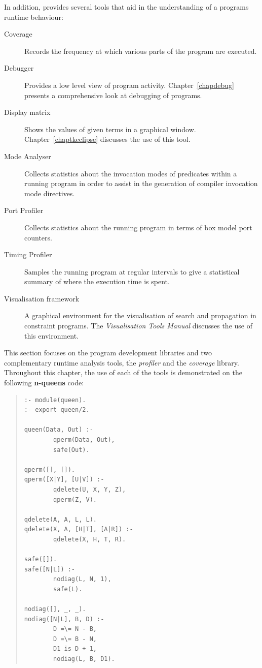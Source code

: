 In addition, \eclipse{} provides several tools that aid in the
understanding of a programs runtime behaviour:

\begin{description}
\item[Coverage] Records the frequency at which various parts of the
program are executed.
\item[Debugger] Provides a low level view of program
activity. Chapter~\ref{chapdebug} presents a comprehensive 
look at debugging of \eclipse{} programs.
\item[Display matrix] Shows the values of given terms in a graphical
window. Chapter~\ref{chaptkeclipse} discusses the use of this tool.
\item[Mode Analyser] Collects statistics about the invocation modes of
predicates within a running program in order to assist in the generation of
compiler invocation mode directives.
\item[Port Profiler] Collects statistics about the running program in terms
of box model port counters.
\item[Timing Profiler] Samples the running program at regular intervals to
give a statistical summary of where the execution time is spent.
\item[Visualisation framework] A graphical environment for the
visualisation of search and propagation in constraint programs.
The \emph{Visualisation Tools Manual} discusses the use of this 
environment.
\end{description}

This section focuses on the program development libraries and two 
complementary runtime analysis tools, the \emph{profiler} and the
\emph{coverage} library.
Throughout this chapter, the use of each of the tools is demonstrated 
on the following \textbf{n-queens} code:
\begin{quote}
\begin{verbatim}
:- module(queen).
:- export queen/2.

queen(Data, Out) :-
        qperm(Data, Out),
        safe(Out).

qperm([], []).
qperm([X|Y], [U|V]) :-
        qdelete(U, X, Y, Z),
        qperm(Z, V).

qdelete(A, A, L, L).
qdelete(X, A, [H|T], [A|R]) :-
        qdelete(X, H, T, R).

safe([]).
safe([N|L]) :-
        nodiag(L, N, 1),
        safe(L).

nodiag([], _, _).
nodiag([N|L], B, D) :-
        D =\= N - B,
        D =\= B - N,
        D1 is D + 1,
        nodiag(L, B, D1).
\end{verbatim}
\end{quote}

